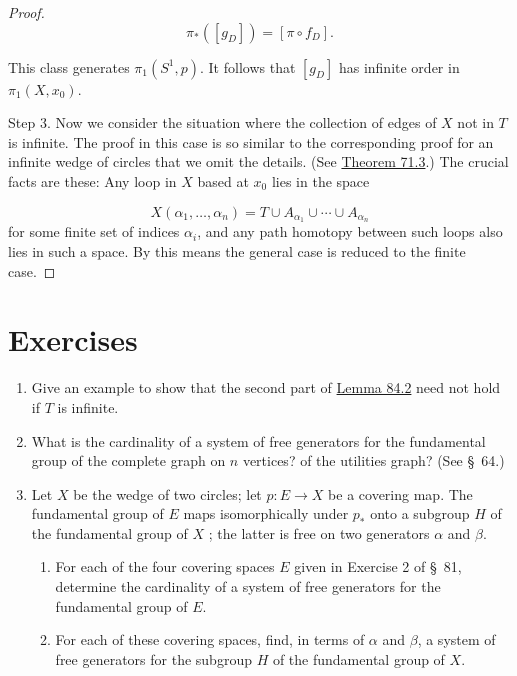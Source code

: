 \begin{proof}
\[
{\pi }_{ * }( [ g_{D}] ) = [ {\pi \circ {f}_{D}}] .
\]

This class generates \({\pi }_{1}( {S^{1},p})\). It follows that \([ g_{D}]\) has infinite order in \({\pi }_{1}( {X,x_{0}})\).

Step 3. Now we consider the situation where the collection of edges of \(X\) not in \(T\) is infinite. The proof in this case is so similar to the corresponding proof for an infinite wedge of circles that we omit the details. (See \hyperref[thm:71.3]{Theorem 71.3}.) The crucial facts are these: Any loop in \(X\) based at \(x_{0}\) lies in the space

\[
X( {{\alpha }_{1},\ldots ,{\alpha }_{n}}) = T \cup {A}_{{\alpha }_{1}} \cup \cdots \cup {A}_{{\alpha }_{n}}
\]
for some finite set of indices \({\alpha }_{i}\), and any path homotopy between such loops also lies in such a space. By this means the general case is reduced to the finite case.
\end{proof}
\section*{Exercises}
\begin{enumerate}[itemsep=0.4em, parsep=0pt, topsep=0pt, partopsep=0pt, leftmargin=*, label=\arabic*., ref=\arabic*]
\item Give an example to show that the second part of \hyperref[lem:84.2]{Lemma 84.2} need not hold if \(T\) is infinite.
\item What is the cardinality of a system of free generators for the fundamental group of the complete graph on \(n\) vertices? of the utilities graph? (See \S\ 64.)
\item Let \(X\) be the wedge of two circles; let \(p : E \rightarrow X\) be a covering map. The fundamental group of \(E\) maps isomorphically under \(p_{ * }\) onto a subgroup \(H\) of the fundamental group of \(X\) ; the latter is free on two generators \(\alpha\) and \(\beta\).
 \begin{enumerate}[itemsep=0.2em, parsep=0pt, topsep=0pt, partopsep=0pt, leftmargin=*, label=(\alph*), align=left]
 \item For each of the four covering spaces \(E\) given in Exercise 2 of \S\ 81, determine the cardinality of a system of free generators for the fundamental group of \(E\).
 \item For each of these covering spaces, find, in terms of \(\alpha\) and \(\beta\), a system of free generators for the subgroup \(H\) of the fundamental group of \(X\).
 \end{enumerate}
\end{enumerate}

